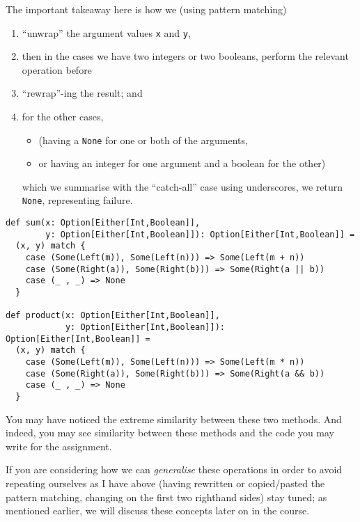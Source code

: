 \documentclass[11pt]{article}
\begin{document}
The important takeaway here is how we (using pattern matching)
\begin{enumerate}
\item “unwrap” the argument values \texttt{x} and \texttt{y},
\item then in the cases we have two integers or two booleans,
perform the relevant operation before
\item “rewrap”-ing the result; and
\item for the other cases,
\begin{itemize}
\item (having a \texttt{None} for one or both of the arguments,
\item or having an integer for one argument and a boolean for the other)
\end{itemize}
which we summarise with the “catch-all” case using underscores,
we return \texttt{None}, representing failure.
\end{enumerate}
\begin{verbatim}
def sum(x: Option[Either[Int,Boolean]],
        y: Option[Either[Int,Boolean]]): Option[Either[Int,Boolean]] =
  (x, y) match {
    case (Some(Left(m)), Some(Left(n))) => Some(Left(m + n))
    case (Some(Right(a)), Some(Right(b))) => Some(Right(a || b))
    case (_ , _) => None
  }

def product(x: Option[Either[Int,Boolean]],
            y: Option[Either[Int,Boolean]]): Option[Either[Int,Boolean]] =
  (x, y) match {
    case (Some(Left(m)), Some(Left(n))) => Some(Left(m * n))
    case (Some(Right(a)), Some(Right(b))) => Some(Right(a && b))
    case (_ , _) => None
  }
\end{verbatim}

You may have noticed the extreme similarity between these two methods.
And indeed, you may see similarity between these methods
and the code you may write for the assignment.

If you are considering how we can \emph{generalise} these
operations in order to avoid repeating ourselves as I have above
(having rewritten or copied/pasted the pattern matching,
changing on the first two righthand sides)
stay tuned; as mentioned earlier, we will discuss these concepts
later on in the course.
\end{document}
